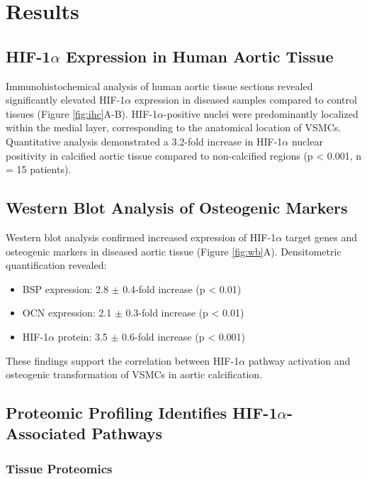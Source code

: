 \documentclass[materials,article,submit,moreauthors,pdftex]{Definitions/mdpi}
\begin{document}
\section{Results}

\subsection{HIF-1$\alpha$ Expression in Human Aortic Tissue}

Immunohistochemical analysis of human aortic tissue sections revealed significantly elevated HIF-1$\alpha$ expression in diseased samples compared to control tissues (Figure \ref{fig:ihc}A-B). HIF-1$\alpha$-positive nuclei were predominantly localized within the medial layer, corresponding to the anatomical location of VSMCs. Quantitative analysis demonstrated a 3.2-fold increase in HIF-1$\alpha$ nuclear positivity in calcified aortic tissue compared to non-calcified regions (p < 0.001, n = 15 patients).

\subsection{Western Blot Analysis of Osteogenic Markers}

Western blot analysis confirmed increased expression of HIF-1$\alpha$ target genes and osteogenic markers in diseased aortic tissue (Figure \ref{fig:wb}A). Densitometric quantification revealed:

\begin{itemize}
    \item BSP expression: 2.8 $\pm$ 0.4-fold increase (p < 0.01)
    \item OCN expression: 2.1 $\pm$ 0.3-fold increase (p < 0.01)
    \item HIF-1$\alpha$ protein: 3.5 $\pm$ 0.6-fold increase (p < 0.001)
\end{itemize}

These findings support the correlation between HIF-1$\alpha$ pathway activation and osteogenic transformation of VSMCs in aortic calcification.

\subsection{Proteomic Profiling Identifies HIF-1$\alpha$-Associated Pathways}

\subsubsection{Tissue Proteomics}
\end{document}
